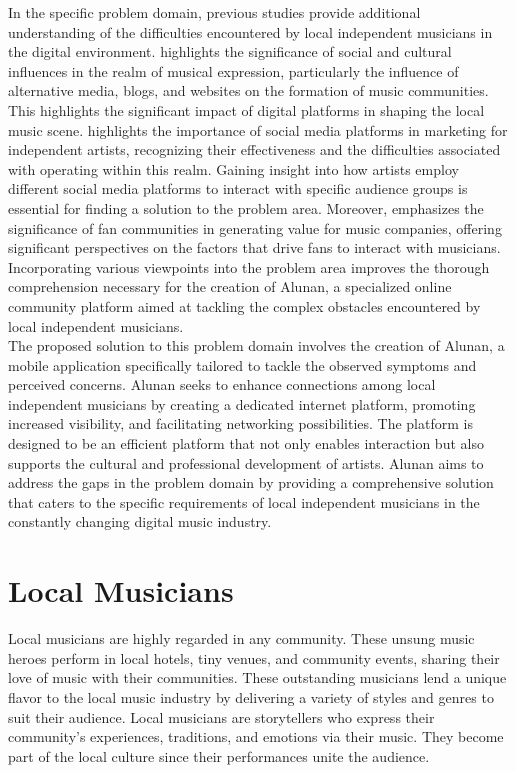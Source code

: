In the specific problem domain, previous studies provide additional understanding of the difficulties encountered by local independent musicians in the digital environment. \textcite{ong19} highlights the significance of social and cultural influences in the realm of musical expression, particularly the influence of alternative media, blogs, and websites on the formation of music communities. This highlights the significant impact of digital platforms in shaping the local music scene. \textcite{zanuar22} highlights the importance of social media platforms in marketing for independent artists, recognizing their effectiveness and the difficulties associated with operating within this realm. Gaining insight into how artists employ different social media platforms to interact with specific audience groups is essential for finding a solution to the problem area. Moreover, \textcite{edlom21} emphasizes the significance of fan communities in generating value for music companies, offering significant perspectives on the factors that drive fans to interact with musicians. Incorporating various viewpoints into the problem area improves the thorough comprehension necessary for the creation of Alunan, a specialized online community platform aimed at tackling the complex obstacles encountered by local independent musicians. \\

The proposed solution to this problem domain involves the creation of Alunan, a mobile application specifically tailored to tackle the observed symptoms and perceived concerns. Alunan seeks to enhance connections among local independent musicians by creating a dedicated internet platform, promoting increased visibility, and facilitating networking possibilities. The platform is designed to be an efficient platform that not only enables interaction but also supports the cultural and professional development of artists. Alunan aims to address the gaps in the problem domain by providing a comprehensive solution that caters to the specific requirements of local independent musicians in the constantly changing digital music industry.

\section{Local Musicians}
Local musicians are highly regarded in any community. These unsung music heroes perform in local hotels, tiny venues, and community events, sharing their love of music with their communities. These outstanding musicians lend a unique flavor to the local music industry by delivering a variety of styles and genres to suit their audience. Local musicians are storytellers who express their community's experiences, traditions, and emotions via their music. They become part of the local culture since their performances unite the audience. \\

